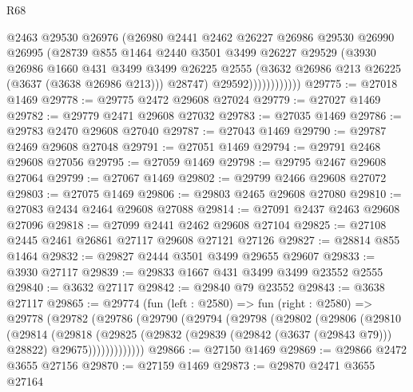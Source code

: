 \begin{lexlean}{R68}
\begin{coremodule}
                        @2463
                        @29530
                        @26976
                        (@26980
                          @2441
                          @2462
                          @26227
                          @26986
                          @29530
                          @26990
                          @26995
                          (@28739
                            @855
                            @1464
                            @2440
                            @3501
                            @3499
                            @26227
                            @29529
                            (@3930
                              @26986
                              @1660
                              @431
                              @3499
                              @3499
                              @26225
                              @2555
                              (@3632 @26986 @213 @26225 (@3637 (@3638 @26986 @213)))
                              @28747)
                            @29592))))))))))))
@29775 := @27018 @1469
@29778 := @29775 @2472 @29608 @27024
@29779 := @27027 @1469
@29782 := @29779 @2471 @29608 @27032
@29783 := @27035 @1469
@29786 := @29783 @2470 @29608 @27040
@29787 := @27043 @1469
@29790 := @29787 @2469 @29608 @27048
@29791 := @27051 @1469
@29794 := @29791 @2468 @29608 @27056
@29795 := @27059 @1469
@29798 := @29795 @2467 @29608 @27064
@29799 := @27067 @1469
@29802 := @29799 @2466 @29608 @27072
@29803 := @27075 @1469
@29806 := @29803 @2465 @29608 @27080
@29810 := @27083 @2434 @2464 @29608 @27088
@29814 := @27091 @2437 @2463 @29608 @27096
@29818 := @27099 @2441 @2462 @29608 @27104
@29825 := @27108 @2445 @2461 @26861 @27117 @29608 @27121 @27126
@29827 := @28814 @855 @1464
@29832 := @29827 @2444 @3501 @3499 @29655 @29607
@29833 := @3930 @27117
@29839 := @29833 @1667 @431 @3499 @3499 @23552 @2555
@29840 := @3632 @27117
@29842 := @29840 @79 @23552
@29843 := @3638 @27117
@29865 := @29774
    (fun (left : @2580) =>
    fun (right : @2580) =>
    @29778
      (@29782
        (@29786
          (@29790
            (@29794
              (@29798
                (@29802
                  (@29806
                    (@29810
                      (@29814
                        (@29818
                          (@29825
                            (@29832
                              (@29839 (@29842 (@3637 (@29843 @79))) @28822)
                              @29675)))))))))))))
@29866 := @27150 @1469
@29869 := @29866 @2472 @3655 @27156
@29870 := @27159 @1469
@29873 := @29870 @2471 @3655 @27164

\end{coremodule}
\end{lexlean}
